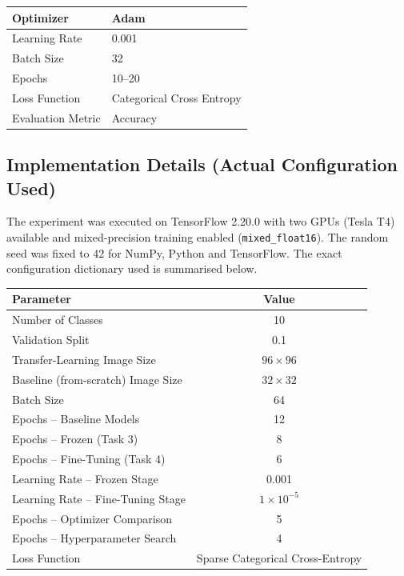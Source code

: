 \documentclass[11pt]{article}
\begin{document}
\begin{center}

\begin{tabular}{|p{5cm}|p{6cm}|}

\hline

Optimizer & Adam\\

\hline

Learning Rate & 0.001\\

\hline

Batch Size & 32\\

\hline

Epochs & 10--20\\

\hline

Loss Function &
Categorical Cross Entropy\\

\hline

Evaluation Metric &
Accuracy\\

\hline

\end{tabular}

\end{center}

\subsection*{Implementation Details (Actual Configuration Used)}

The experiment was executed on TensorFlow 2.20.0 with two GPUs (Tesla T4)
available and mixed-precision training enabled
(\texttt{mixed\_float16}). The random seed was fixed to 42 for NumPy,
Python and TensorFlow. The exact configuration dictionary used is
summarised below.

\begin{center}
\begin{tabular}{|l|c|}
\hline
Parameter & Value\\
\hline
Number of Classes & 10\\
Validation Split & 0.1\\
Transfer-Learning Image Size & $96\times96$\\
Baseline (from-scratch) Image Size & $32\times32$\\
Batch Size & 64\\
Epochs -- Baseline Models & 12\\
Epochs -- Frozen (Task 3) & 8\\
Epochs -- Fine-Tuning (Task 4) & 6\\
Learning Rate -- Frozen Stage & 0.001\\
Learning Rate -- Fine-Tuning Stage & $1\times10^{-5}$\\
Epochs -- Optimizer Comparison & 5\\
Epochs -- Hyperparameter Search & 4\\
Loss Function & Sparse Categorical Cross-Entropy\\
\hline
\end{tabular}
\end{center}
\end{document}
